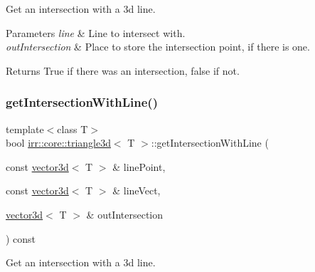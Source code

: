 Get an intersection with a 3d line. 


\begin{DoxyParams}{Parameters}
{\em line} & Line to intersect with. \\
\hline
{\em out\+Intersection} & Place to store the intersection point, if there is one. \\
\hline
\end{DoxyParams}
\begin{DoxyReturn}{Returns}
True if there was an intersection, false if not. 
\end{DoxyReturn}
\mbox{\label{classirr_1_1core_1_1triangle3d_a70e0d27d17f9f0d14117df912cdaafe1}} 
\subsubsection{\texorpdfstring{get\+Intersection\+With\+Line()}{getIntersectionWithLine()}\hspace{0.1cm}{\footnotesize\ttfamily [1/2]}}
{\footnotesize\ttfamily template$<$class T$>$ \\
bool \hyperlink{classirr_1_1core_1_1triangle3d}{irr\+::core\+::triangle3d}$<$ T $>$\+::get\+Intersection\+With\+Line (\begin{DoxyParamCaption}\item[{const \hyperlink{classirr_1_1core_1_1vector3d}{vector3d}$<$ T $>$ \&}]{line\+Point,  }\item[{const \hyperlink{classirr_1_1core_1_1vector3d}{vector3d}$<$ T $>$ \&}]{line\+Vect,  }\item[{\hyperlink{classirr_1_1core_1_1vector3d}{vector3d}$<$ T $>$ \&}]{out\+Intersection }\end{DoxyParamCaption}) const\hspace{0.3cm}{\ttfamily [inline]}}



Get an intersection with a 3d line. 

